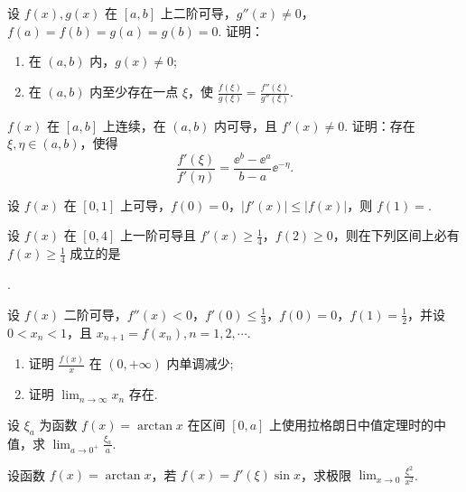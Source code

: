 	\begin{ti}
		设 $f(x), g(x)$ 在 $[a,b]$ 上二阶可导，$g''(x) \ne 0$，$f(a) = f(b) = g(a) = g(b) = 0$. 证明：
		\begin{enumerate}
			\item 在 $(a,b)$ 内，$g(x) \ne 0$;
			\item 在 $(a,b)$ 内至少存在一点 $\xi$，使 $\frac{f(\xi)}{g(\xi)} = \frac{f''(\xi)}{g''(\xi)}$.
		\end{enumerate}
	\end{ti}

	\begin{ti}
		$f(x)$ 在 $[a,b]$ 上连续，在 $(a,b)$ 内可导，且 $f'(x) \ne 0$. 证明：存在 $\xi, \eta \in (a,b)$，使得
		\[
			\frac{f'(\xi)}{f'(\eta)} = \frac{\ee^{b} - \ee^{a}}{b - a} \ee^{-\eta}.
		\]
	\end{ti}

	\begin{ti}
		设 $f(x)$ 在 $[0,1]$ 上可导，$f(0) = 0$，$\left| f'(x) \right| \leq \left| f(x) \right|$，则 $f(1) = $\htwo.
	\end{ti}

	\begin{ti}
		设 $f(x)$ 在 $[0,4]$ 上一阶可导且 $f'(x) \geq \frac{1}{4}$，$f(2) \geq 0$，则在下列区间上必有 $f(x) \geq \frac{1}{4}$ 成立的是
		
		\noindent\kuo.

		\fourch{$[0,1]$}{$[1,2]$}{$[2,3]$}{$[3,4]$}
	\end{ti}

	\begin{ti}
		设 $f(x)$ 二阶可导，$f''(x) < 0$，$f'(0) \leq \frac{1}{3}$，$f(0) = 0$，$f(1) = \frac{1}{2}$，并设 $0 < x_{n} < 1$，且 $x_{n+1} = f(x_{n}), n = 1,2,\cdots$.
		\begin{enumerate}
			\item 证明 $\frac{f(x)}{x}$ 在 $(0,+\infty)$ 内单调减少;
			\item 证明 $\lim_{n \to \infty} x_{n}$ 存在.
		\end{enumerate}
	\end{ti}

	\begin{ti}
		设 $\xi_{a}$ 为函数 $f(x) = \arctan x$ 在区间 $[0,a]$ 上使用拉格朗日中值定理时的中值，求 $\lim_{a \to 0^{+}} \frac{\xi_{a}}{a}$.
	\end{ti}

	\begin{ti}
		设函数 $f(x) = \arctan x$，若 $f(x) = f'(\xi) \sin x$，求极限 $\lim_{x \to 0} \frac{\xi^{2}}{x^{2}}$.
	\end{ti}

